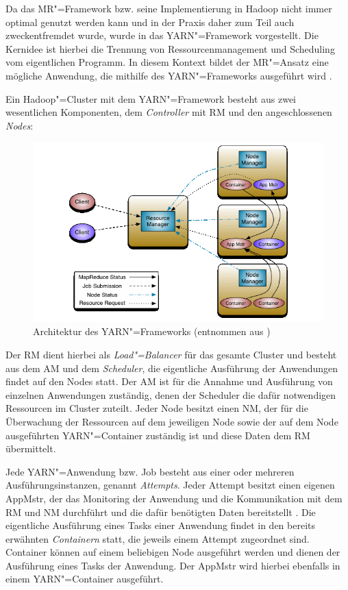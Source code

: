 Da das \gls{MR}"=Framework bzw. seine Implementierung in Hadoop nicht immer optimal genutzt werden kann und in der Praxis daher zum Teil auch zweckentfremdet wurde, wurde in \cite{Vavilapalli2013} das YARN"=Framework vorgestellt.
Die Kernidee ist hierbei die Trennung von Ressourcenmanagement und Scheduling vom eigentlichen Programm.
In diesem Kontext bildet der \gls{MR}"=Ansatz eine mögliche Anwendung, die mithilfe des YARN"=Frameworks ausgeführt wird \cite{Vavilapalli2013}.

Ein Hadoop"=Cluster mit dem YARN"=Framework besteht aus zwei wesentlichen Komponenten, dem \emph{Controller} mit \gls{RM} und den angeschlossenen \emph{Nodes}:

\begin{figure}[h]
    \includegraphics{./resources/yarn_architecture.png}
    \caption[Architektur des YARN"=Frameworks]
    {Architektur des YARN"=Frameworks (entnommen aus \cite{HadoopYarnArch271})}
    \label{fig:yarnarch}
\end{figure}

Der \gls{RM} dient hierbei als \emph{Load"=Balancer} für das gesamte Cluster und besteht aus dem \gls{AM} und dem \emph{Scheduler}, die eigentliche Ausführung der Anwendungen findet auf den Nodes statt.
Der \gls{AM} ist für die Annahme und Ausführung von einzelnen Anwendungen zuständig, denen der Scheduler die dafür notwendigen Ressourcen im Cluster zuteilt.
Jeder Node besitzt einen \gls{NM}, der für die Überwachung der Ressourcen auf dem jeweiligen Node sowie der auf dem Node ausgeführten YARN"=Container zuständig ist und diese Daten dem \gls{RM} übermittelt.

Jede YARN"=Anwendung bzw. Job besteht aus einer oder mehreren Ausführungsinstanzen, genannt \emph{Attempts}.
Jeder Attempt besitzt einen eigenen \gls{AppMstr}, der das Monitoring der Anwendung und die Kommunikation mit dem \gls{RM} und \gls{NM} durchführt und die dafür benötigten Daten bereitstellt \cite{HadoopYarnArch271}.
Die eigentliche Ausführung eines Tasks einer Anwendung findet in den bereits erwähnten \emph{Containern} statt, die jeweils einem Attempt zugeordnet sind.
Container können auf einem beliebigen Node ausgeführt werden und dienen der Ausführung eines Tasks der Anwendung.
Der \gls{AppMstr} wird hierbei ebenfalls in einem YARN"=Container ausgeführt.

